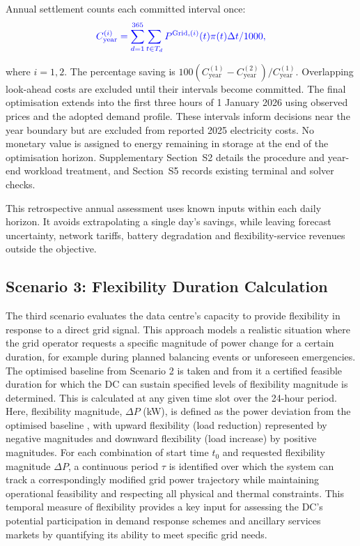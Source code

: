 \documentclass[lettersize,journal]{IEEEtran}
\providecommand{\DIFadd}[1]{{\color{blue}#1}}
\providecommand{\DIFaddbegin}{}
\providecommand{\DIFaddend}{}
\begin{document}
\DIFadd{Annual settlement counts each committed interval once:
}\begin{equation}
\DIFadd{C^{(i)}_{\mathrm{year}}=\sum_{d=1}^{365}\sum_{t\in T_d}P^{\mathrm{Grid},(i)}(t)\pi(t)\Delta t/1000,
\label{eq:annual-cost}
}\end{equation}
\DIFadd{where $i=1,2$. The percentage saving is $100(C^{(1)}_{\mathrm{year}}-C^{(2)}_{\mathrm{year}})/C^{(1)}_{\mathrm{year}}$. Overlapping look-ahead costs are excluded until their intervals become committed. The final optimisation extends into the first three hours of 1 January 2026 using observed prices and the adopted demand profile. These intervals inform decisions near the year boundary but are excluded from reported 2025 electricity costs. No monetary value is assigned to energy remaining in storage at the end of the optimisation horizon. Supplementary Section~S2 details the procedure and year-end workload treatment, and Section~S5 records existing terminal and solver checks.

}

\DIFadd{This retrospective annual assessment uses known inputs within each daily horizon. It avoids extrapolating a single day's savings, while leaving forecast uncertainty, network tariffs, battery degradation and flexibility-service revenues outside the objective.

}


\DIFaddend \subsection{Scenario 3: Flexibility Duration Calculation}\label{sec:scenario 3}
The third scenario evaluates the data centre's capacity to provide flexibility in response to a direct grid signal. This approach models a realistic situation where the grid operator requests a specific magnitude of power change for a certain duration, for example during planned balancing events or unforeseen emergencies. The optimised baseline from Scenario 2 is taken and from it  \DIFaddbegin \DIFadd{a certified feasible }\DIFaddend duration for which the DC can sustain specified levels of flexibility magnitude is determined. This is calculated at any given time slot over the 24-hour period. Here, flexibility magnitude, $\Delta P$ (kW), is defined as the power deviation from the optimised baseline \DIFaddbegin \DIFadd{, }\DIFaddend with upward flexibility (load reduction) represented by negative magnitudes and downward flexibility (load increase) by positive magnitudes. For each combination of start time $t_0$ and requested flexibility magnitude $\Delta P$,  \DIFaddbegin \DIFadd{a }\DIFaddend continuous period $\tau$ is  \DIFaddbegin \DIFadd{identified }\DIFaddend over which the system can track a correspondingly modified  \DIFaddbegin \DIFadd{grid power }\DIFaddend trajectory while maintaining operational feasibility and respecting all physical and thermal constraints. This temporal measure of flexibility provides a key input for assessing the DC's potential participation in  \DIFaddbegin \DIFadd{demand response schemes and ancillary services }\DIFaddend markets by quantifying its ability to meet specific grid needs.
\end{document}
